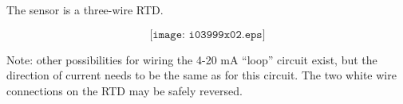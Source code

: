 \vskip 10pt

The sensor is a three-wire RTD.







$$\texttt{[image: i03999x02.eps]}$$

Note: other possibilities for wiring the 4-20 mA ``loop'' circuit exist, but the direction of current needs to be the same as for this circuit.  The two white wire connections on the RTD may be safely reversed. 




